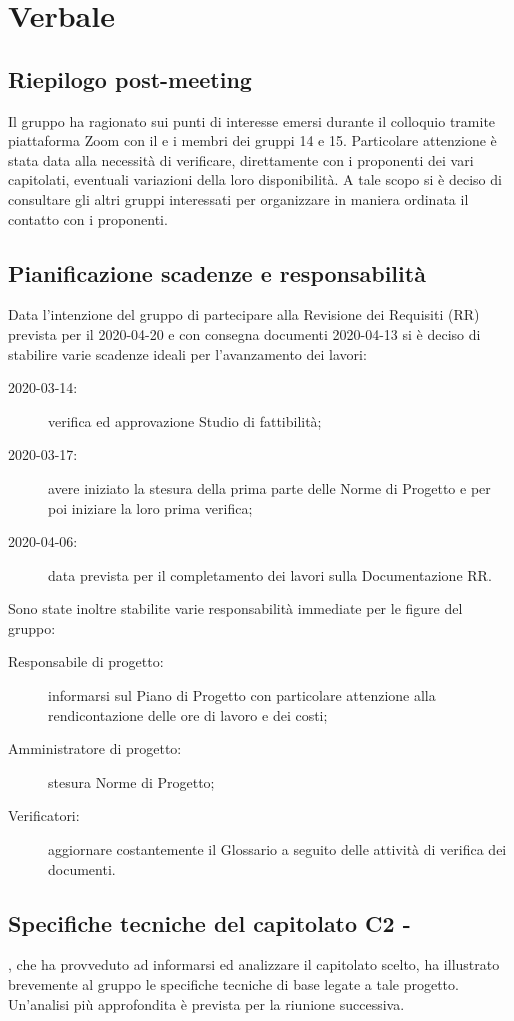 \section{Verbale}
\subsection{Riepilogo post-meeting}
Il gruppo ha ragionato sui punti di interesse emersi durante il colloquio tramite piattaforma Zoom con il \TV{} e i membri dei gruppi 14 e 15. Particolare attenzione è stata data alla necessità di verificare, direttamente con i proponenti dei vari capitolati, eventuali variazioni della loro disponibilità. A tale scopo si è deciso di consultare gli altri gruppi interessati per organizzare in maniera ordinata il contatto con i proponenti.

\subsection{Pianificazione scadenze e responsabilità}
Data l'intenzione del gruppo di partecipare alla Revisione dei Requisiti (RR) prevista per il 2020-04-20 e con consegna documenti 2020-04-13 si è deciso di stabilire varie scadenze ideali per l'avanzamento dei lavori:
\begin{description}
	\item[2020-03-14:] verifica ed approvazione Studio di fattibilità;
	\item[2020-03-17:] avere iniziato la stesura della prima parte delle Norme di Progetto e per poi iniziare la loro prima verifica;
	\item[2020-04-06:] data prevista per il completamento dei lavori sulla Documentazione RR.
\end{description}
Sono state inoltre stabilite varie responsabilità immediate per le figure del gruppo:
\begin{description}
	\item[Responsabile di progetto:] informarsi sul Piano di Progetto con particolare attenzione alla rendicontazione delle ore di lavoro e dei costi;
	\item[Amministratore di progetto:] stesura Norme di Progetto;
	\item[Verificatori:] aggiornare costantemente il Glossario a seguito delle attività di verifica dei documenti.
\end{description}

\subsection{Specifiche tecniche del capitolato C2 - \NomeProgetto}
\EG{}, che ha provveduto ad informarsi ed analizzare il capitolato scelto, ha illustrato brevemente al gruppo le specifiche tecniche di base legate a tale progetto. Un'analisi più approfondita è prevista per la riunione successiva.

